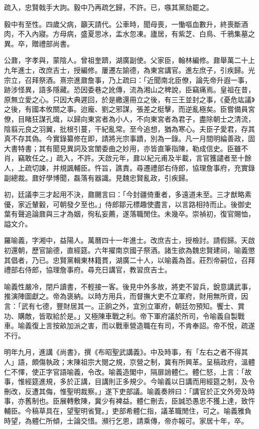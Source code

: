 \begin{pinyinscope}
{{疏入，忠賢戟手大訽。毅中乃再疏乞歸，不許。已，嗾其黨劾罷之。

毅中有至性。四歲父病，籲天請代。公車時，聞母喪，一慟嘔血數升，終喪斷酒肉，不入內寢。方母病，盛夏思冰，盂水忽凍。廬居，有紫芝、白鳥、千鴉集墓之異。卒，贈禮部尚書。

公鼐，字孝與，蒙陰人。曾祖奎躋，湖廣副使。父家臣，翰林編修。鼐舉萬二十上九年進士，改庶吉士，授編修。屢遷左諭德，為東宮講官。進左庶子，引疾歸。光宗立，召拜祭酒。熹宗進鼐詹事，乃上疏曰：「近聞南北臣僚，論先帝升遐一事，跡涉怪異，語多隱藏。恐因委巷之訛傳，流為湘山之稗說，臣竊痛焉。皇祖在昔，原無立愛之心。只因大典遲回，於是繳還冊立之後，有三王並封之事，《憂危竑議》之後，有國本攸關之事。迨龐、劉之邪謀，張差之梃擊，而逆亂極矣。臣嘗備員宮僚，目睹狂謀孔熾，以歸向東宮者為小人，不向東宮者為君子，盡除朝士之清流，陰翦元良之羽翼，批根引蔓，干紀亂常。至今追想，猶為寒心。夫臣子愛君，存其真不存其偽。今實錄纂修在即，請將光宗事蹟，別為一錄。凡一月間明綸善政，固大書特書；其有聞見異詞及宮闈委曲之妙用，亦皆直筆指陳，勒成信史。臣雖不肖，竊敢任之。」疏入，不許。天啟元年，鼐以紀元甫及半載，言官獲譴者至十餘人，上疏切諫，并規諷輔臣。忤旨，譙責。尋遷禮部右侍郎，協理詹事府，充實錄副總裁。鼐好學博聞，磊落有器識。見魏忠賢亂政，引疾歸。

初，廷議李三才起用不決，鼐颺言曰：「今封疆倚重者，多遠道未至。三才猷略素優，家近輦轂，可朝發夕至也。」侍郎鄒元標趣使盡言，以言路相持而止。後御史葉有聲追論鼐與三才為姻，徇私妄薦，遂落職閒住。未幾卒。崇禎初，復官賜恤，謚文介。

羅喻義，字湘中，益陽人。萬曆四十一年進士。改庶吉士，授檢討。請假歸。天啟初還朝，歷官諭德，直經筵。六年擢南京國子祭酒。諸生欲為魏忠賢建祠，喻義懲其倡者，乃已。忠賢黨輯東林籍貫，湖廣二十人，以喻義為首。莊烈帝嗣位，召拜禮部右侍郎，協理詹事府。尋充日講官，教習庶吉士。

喻義性嚴冷，閉戶讀書，不輕接一客。後見中外多故，將吏不習兵，銳意講武事，推演陣圖獻之。帝為褒納。以時方用兵，而督撫大吏不立軍府，財用無所資，因言：「武有七德，豐財居其一。正餉之外，宜別立軍府，朝廷勿預知。饗士、賞功、購敵，皆取給於是。」又極陳車戰之利。帝下軍府議於所司，令喻義自製戰車。喻義復上言按畝加派之害，而以戰車營造職在有司，不肯奉詔。帝不悅，疏遂不行。

明年九月，進講《尚書》，撰《布昭聖武講義》。中及時事，有「左右之者不得其人」語，頗傷執政；末陳祖宗大閱之規，京營之制，冀有所興革。呈稿政府，溫體仁不懌，使正字官語喻義，令改。喻義造閣中，隔扉誚體仁。體仁怒，上言：「故事，惟經筵進規，多於正講，目講則正多規少。今喻義以日講而用經筵之制，及令刪改，反遭其侮，惟聖明裁察。」遂下吏部議。喻義奏辨曰：「講官於正文外旁及時事，亦舊制也。臣展轉敷陳，冀少有裨益。體仁刪去，臣誠恐愚忠不獲上達，致忤輔臣。今稿草具在，望聖明省覽。」吏部希體仁指，議革職閒住，可之。喻義雅負時望，為體仁所傾，士論交惜。瀕行乞恩，請乘傳，帝亦報可。家居十年，卒。

}}
\end{pinyinscope}
